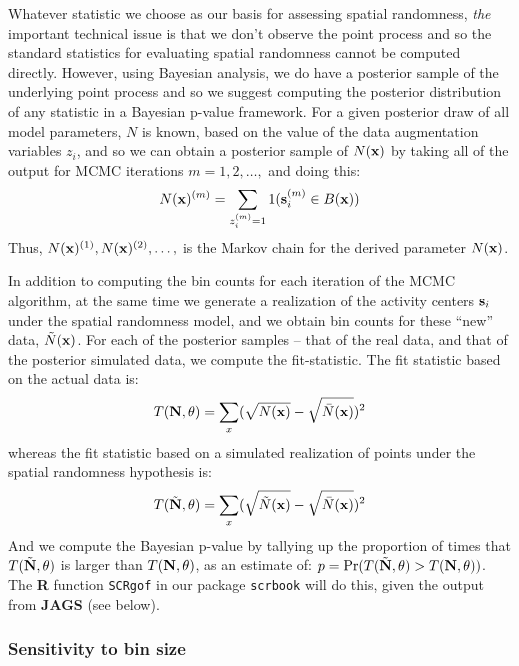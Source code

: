 Whatever statistic we choose as our basis for assessing spatial
randomness, {\it the} important technical issue is that we don't
observe the point process and so the standard statistics for
evaluating spatial randomness cannot be computed directly.  However,
using Bayesian analysis, we do have a posterior sample of the
underlying point process and so we suggest computing the posterior
distribution of any statistic in a Bayesian p-value framework.
For a given
posterior draw of all model parameters, $N$ is known, based on the
value of the data augmentation variables $z_{i}$, and so we can obtain
a posterior sample of $N({\bf x})$ by taking all of the output for
MCMC iterations $m=1,2,\ldots,$ and doing this:
\[
   N({\bf x})^{(m)} = \sum_{z_{i}^{(m)}=1} 1({\bf s}_{i}^{(m)} \in B({\bf x}))
\]
Thus, $N({\bf x})^{(1)}, N({\bf x})^{(2)}, \ldots,$ is the Markov
chain for the derived parameter $N({\bf x})$.

In addition to computing the bin counts for each iteration of the MCMC
algorithm, at the same time we generate a realization of the activity
centers ${\bf s}_{i}$ under the spatial randomness model, and we
obtain bin counts for these ``new'' data, $\tilde{N}({\bf x})$. For each of
the posterior samples -- that of the real data, and that of the
posterior simulated data, we compute the fit-statistic. The fit 
statistic based on the actual data is:
\[
T({\bf N},\theta) = \sum_{x}  (\sqrt{N({\bf x})} - \sqrt{ \bar{N}({\bf x})})^2
\]
whereas the fit statistic based on a simulated realization of points under the
spatial randomness hypothesis is:
\[
T(\tilde{\bf N},\theta) = \sum_{x}  (\sqrt{\tilde{N}({\bf x})} - \sqrt{
  \bar{N}({\bf x})})^2
\]
And we compute the Bayesian p-value by tallying up the proportion of
times that $T(\tilde{\bf N},\theta)$ is larger than $T({\bf
  N},\theta)$, as an estimate of: $p = \Pr(T(\tilde{\bf N},\theta) >
T({\bf N},\theta))$.  The {\bf R} function {\tt SCRgof} in our package
\mbox{\tt scrbook} will do this, given
the output from {\bf JAGS}
(see below).



\subsubsection{Sensitivity to bin size}

